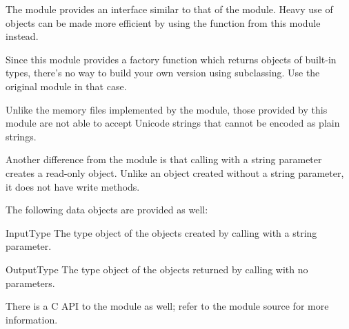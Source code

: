 The module  provides an interface similar to that of
the  module.  Heavy use of 
objects can be made more efficient by using the function
 from this module instead.

Since this module provides a factory function which returns objects of
built-in types, there's no way to build your own version using
subclassing.  Use the original  module in that case.

Unlike the memory files implemented by the 
module, those provided by this module are not able to accept Unicode
strings that cannot be encoded as plain \ASCII{} strings.

Another difference from the  module is that calling
 with a string parameter creates a read-only object.
Unlike an object created without a string parameter, it does not have
write methods.

The following data objects are provided as well:


\begin{datadesc}{InputType}
  The type object of the objects created by calling
   with a string parameter.
\end{datadesc}

\begin{datadesc}{OutputType}
  The type object of the objects returned by calling
   with no parameters.
\end{datadesc}


There is a C API to the module as well; refer to the module source for 
more information.
